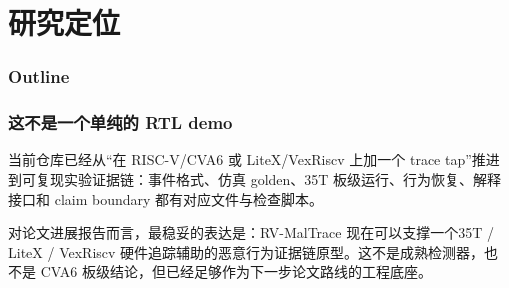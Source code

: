 \documentclass[aspectratio=169,10pt]{beamer}
\begin{document}
\section{研究定位}

\begin{frame}
  \frametitle{Outline}
  \vskip0.4cm
  \tableofcontents[currentsection]
\end{frame}

\begin{frame}
  \frametitle{这不是一个单纯的 RTL demo}
  \vskip0.15cm

  当前仓库已经从“在 RISC-V/CVA6 或 LiteX/VexRiscv 上加一个 trace tap”推进到\alert{可复现实验证据链}：事件格式、仿真 golden、35T 板级运行、行为恢复、解释接口和 claim boundary 都有对应文件与检查脚本。

  \vskip0.22cm

  对论文进展报告而言，最稳妥的表达是：RV-MalTrace 现在可以支撑一个\alert{35T / LiteX / VexRiscv 硬件追踪辅助的恶意行为证据链原型}。这不是成熟检测器，也不是 CVA6 板级结论，但已经足够作为下一步论文路线的工程底座。

  \vskip0.2cm
\end{frame}
\end{document}
